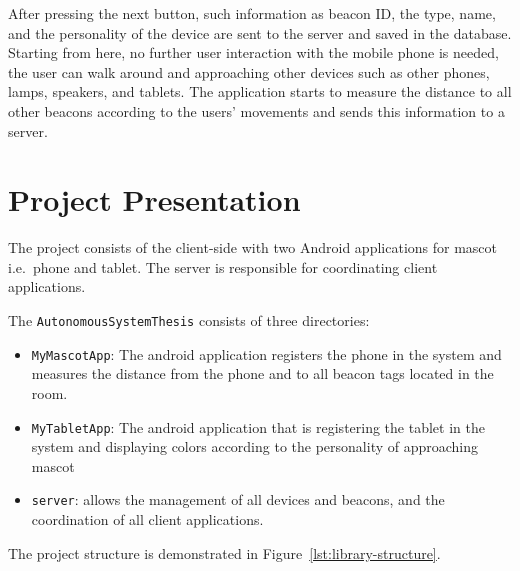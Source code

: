 After pressing the next button, such information as beacon ID,
the type, name, and the personality of the device are sent to the server and saved in the database.
Starting from here, no further user interaction with the mobile phone is needed, the user can walk
around and approaching other devices such as other phones, lamps, speakers, and tablets.
The application starts to measure the distance to all other beacons according to the users'
movements and sends this information to a server.

\section{Project Presentation}
\label{sec:project-presentation}
The project consists of the client-side with two Android applications for mascot i.e.\ phone and tablet.
The server is responsible for coordinating client applications.

The \texttt{AutonomousSystemThesis} consists of three directories:

\begin{itemize}
    \item \texttt{MyMascotApp}: The android application registers the phone in the system and measures the distance
    from the phone and to all beacon tags located in the room.
    \item \texttt{MyTabletApp}: The android application that is registering the tablet in the system and displaying colors according to the personality of approaching mascot
    \item \texttt{server}: allows the management of all devices and beacons, and the coordination of all client applications.
\end{itemize}

The project structure is demonstrated in Figure~\ref{lst:library-structure}.

